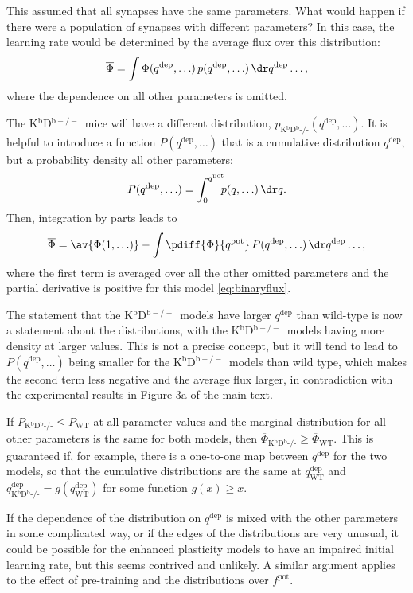 \documentclass[10pt]{article}
\newcommand{\pot}{^{\text{pot}}}
\newcommand{\dep}{^{\text{dep}}}
\newcommand{\wt}{_{\text{WT}}}
\newcommand{\ko}{_{\text{K$^\mathrm{b}$D$^\mathrm{b}$-/-}}}
\newcommand{\KO}{K$^\mathrm{b}$D$^{\mathrm{b}-/-}$}
\newcommand{\modelfig}[1][a]{Figure 3#1 of the main text}
\begin{document}
This assumed that all synapses have the same parameters.
What would happen if there were a population of synapses with different parameters?
In this case, the learning rate would be determined by the average flux over this distribution:
%
\begin{equation}\label{eq:meanflux}
  \overline{\Phi} = \int \Phi(q\dep, \ldots) \,
                            p(q\dep, \ldots) \,
                          \dr q\dep \ldots,
\end{equation}
%
where the dependence on all other parameters is omitted.

The \KO\ mice will have a different distribution, $p\ko(q\dep, \ldots)$.
It is helpful to introduce a function $P(q\dep, \ldots)$ that is a cumulative distribution \wrt $q\dep$, but a probability density \wrt all other parameters:
%
\begin{equation}\label{eq:cumul}
  P(q\dep, \ldots) = \int_0^{q\pot} \!\!\! p(q, \ldots) \, \dr q.
\end{equation}
%
Then, integration by parts leads to
%
\begin{equation}\label{eq:fluxcumul}
  \overline{\Phi} = \av{\Phi(1, \ldots)} -
             \int \pdiff{\Phi}{q\pot} \,
                            P(q\dep, \ldots) \,
                          \dr q\dep \ldots,
\end{equation}
%
where the first term is averaged over all the other omitted parameters and the partial derivative is positive for this model \eqref{eq:binaryflux}.

The statement that the \KO\ models have larger $q\dep$ than wild-type is now a statement about the distributions, with the \KO\ models having more density at larger values.
This is not a precise concept, but it will tend to lead to $P(q\dep, \ldots)$ being smaller for the \KO\ models than wild type, which makes the second term less negative and the average flux larger, in contradiction with the experimental results in \modelfig.

If $P\ko \leq P\wt$ at all parameter values and the marginal distribution for all other parameters is the same for both models, then $\overline{\Phi}\ko \geq \overline{\Phi}\wt$.
This is guaranteed if, for example, there is a one-to-one map between $q\dep$ for the two models, so that the cumulative distributions are the same at $q\dep\wt$ and $q\dep\ko = g(q\dep\wt)$ for some function $g(x) \geq x$.

If the dependence of the distribution on $q\dep$ is mixed with the other parameters in some complicated way, or if the edges of the distributions are very unusual, it could be possible for the enhanced plasticity models to have an impaired initial learning rate, but this seems contrived and unlikely.
A similar argument applies to the effect of pre-training and the distributions over $f\pot$.
\end{document}
